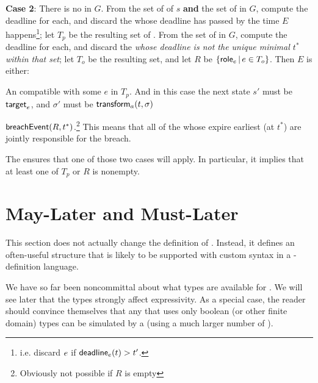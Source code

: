 \documentclass[12pt]{article}
\begin{document}
{\bf Case 2}: There is no \enabled \mustntran in $G$. From the set of \enabled \mayntrans of $s$ {\bf and} the set of \enabled \rmustntrans in $G$, compute the deadline for each, and discard the \transitions whose deadline has passed by the time $E$ happens\footnote{i.e. discard $e$ if $\textsf{deadline}_{e}(t) > t'$.};  let $T_p$ be the resulting set of \transitions. From the set of \enabled \rmustntrans in $G$, compute the deadline for each, and discard the {\transitions} {\it whose deadline is not the unique minimal \TimeStamp $t^*$ within that set}; let $T_o$ be the resulting set, and let $R$ be $\{ \textsf{role}_{e} \, \vert \, e \in T_{o} \}$. Then $E$ is either:
\begin{PPI}
	\item An \Event compatible with some \transition $e$ in $T_p$. And in this case the next state $s'$ must be $\textsf{target}_{e}$, and $\sigma'$ must be $\textsf{transform}_{a}(t,\sigma)$
	\item $\textsf{breachEvent}(R,t^*)$.\footnote{Obviously not possible if $R$ is empty} This means that all of the \Roles whose \enabled \rmustntran expire earliest (at $t^*$) are jointly responsible for the breach.
\end{PPI}
The \bostgc ensures that one of those two cases will apply. In particular, it implies that at least one of $T_p$ or $R$ is nonempty.







\section{May-Later and Must-Later}  \label{slater}


This section does not actually change the definition of \Contract. Instead, it defines an often-useful \Contract structure that is likely to be supported with custom syntax in a \Contract-definition language.

We have so far been noncommittal about what types are available for \GVars.%
We will see later that the types strongly affect expressivity. As a special case, the reader should convince themselves that any \Contract that uses only boolean (or other finite domain) types can be simulated by a \FSContract (using a much larger number of \States).
\end{document}
